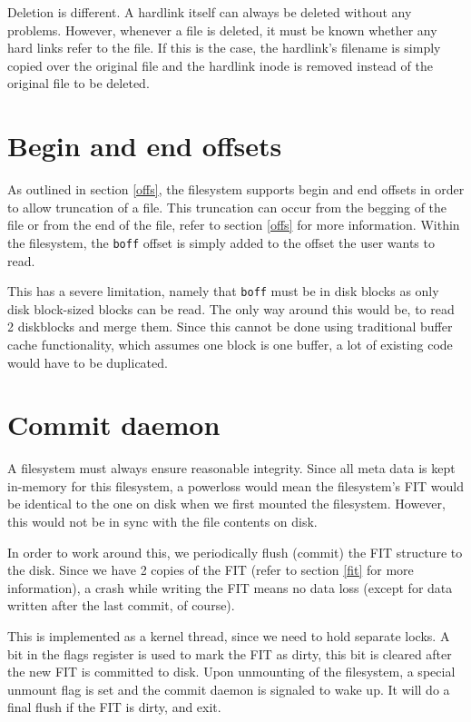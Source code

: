 Deletion is different. A hardlink itself can always be deleted without any problems. However, whenever a file is deleted, it must be known whether any hard links refer to the file. If this is the case, the hardlink's filename is simply copied over the original file and the hardlink inode is removed instead of the original file to be deleted.

\section{Begin and end offsets}
\label{impl_offs}

As outlined in section \ref{offs}, the filesystem supports begin and end offsets in order to allow truncation of a file. This truncation can occur from the begging of the file or from the end of the file, refer to section \ref{offs} for more information. Within the filesystem, the \texttt{boff} offset is simply added to the offset the user wants to read.

This has a severe limitation, namely that \texttt{boff} must be in disk blocks as only disk block-sized blocks can be read. The only way around this would be, to read 2 diskblocks and merge them. Since this cannot be done using traditional buffer cache functionality, which assumes one block is one buffer, a lot of existing code would have to be duplicated.

\section{Commit daemon}

A filesystem must always ensure reasonable integrity. Since all meta data is kept in-memory for this filesystem, a powerloss would mean the filesystem's FIT would be identical to the one on disk when we first mounted the filesystem. However, this would not be in sync with the file contents on disk.

In order to work around this, we periodically flush (commit) the FIT structure to the disk. Since we have 2 copies of the FIT (refer to section \ref{fit} for more information), a crash while writing the FIT means no data loss (except for data written after the last commit, of course).

This  is implemented as a kernel thread, since we need to hold separate locks. A bit in the flags register is used to mark the FIT as dirty, this bit is cleared after the new FIT is committed to disk. Upon unmounting of the filesystem, a special unmount flag is set and the commit daemon is signaled to wake up. It will do a final flush if the FIT is dirty, and exit.

